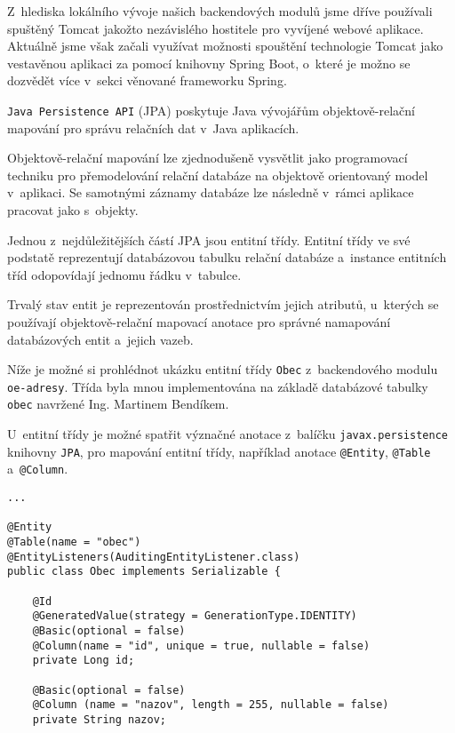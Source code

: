 \documentclass[twoside, 12pt]{article}
\begin{document}
{Z~hlediska lokálního vývoje našich backendových modulů jsme dříve používali
spuštěný Tomcat jakožto nezávislého hostitele pro vyvíjené webové aplikace.
Aktuálně jsme však začali využívat možnosti spouštění technologie Tomcat jako vestavěnou
aplikaci za pomocí knihovny Spring Boot, o~které je možno se dozvědět více v~sekci
věnované frameworku Spring.

\texttt{Java Persistence API} (JPA) poskytuje Java vývojářům
objektově-relační mapování pro správu relačních dat v~Java aplikacích.

Objektově-relační mapování lze zjednodušeně vysvětlit jako
programovací techniku pro přemodelování relační databáze
na objektově orientovaný model v~aplikaci.
Se samotnými záznamy databáze lze následně v~rámci aplikace pracovat jako s~objekty.


Jednou z~nejdůležitějších částí JPA jsou entitní třídy.
Entitní třídy ve své podstatě reprezentují databázovou tabulku
relační databáze a~instance entitních tříd odopovídají jednomu řádku v~tabulce.

Trvalý stav entit je reprezentován prostřednictvím jejich atributů,
u~kterých se používají objektově-relační mapovací anotace
pro správné namapování databázových entit a~jejich vazeb.

Níže je možné si prohlédnot ukázku entitní třídy \texttt{Obec} z~backendového
modulu \texttt{oe-adresy}.
Třída byla mnou implementována na základě databázové tabulky
\texttt{obec} navržené Ing. Martinem Bendíkem.

U~entitní třídy je možné spatřit
význačné anotace z~balíčku \texttt{javax.persistence} knihovny \texttt{JPA},
pro mapování entitní třídy, například anotace \texttt{@Entity}, \texttt{@Table}
a~\texttt{@Column}.

\begin{lstlisting}
...

@Entity
@Table(name = "obec")
@EntityListeners(AuditingEntityListener.class)
public class Obec implements Serializable {

    @Id
    @GeneratedValue(strategy = GenerationType.IDENTITY)
    @Basic(optional = false)
    @Column(name = "id", unique = true, nullable = false)
    private Long id;

    @Basic(optional = false)
    @Column (name = "nazov", length = 255, nullable = false)
    private String nazov;


\end{lstlisting}}
\end{document}
